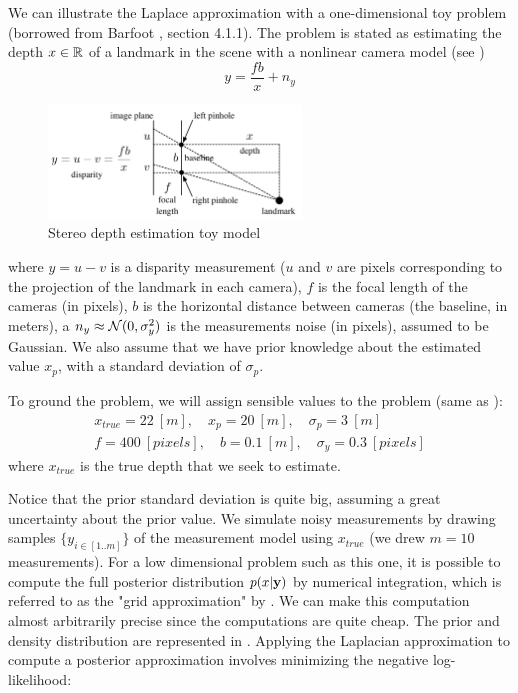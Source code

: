  We can illustrate the Laplace approximation with a one-dimensional toy problem (borrowed from Barfoot \cite{barfoot2017state}, section 4.1.1).
The problem is stated as estimating the depth $x \in \mathbb{R}$ of a landmark in the scene with a nonlinear camera model (see )
%
\begin{equation}
    y = \frac{fb}{x} + n_y
\end{equation}
%
%
\begin{figure}[h]
    \centering
    \includegraphics[width=0.6\textwidth]{figures/barfoot_stereo.png}
    \caption{Stereo depth estimation toy model \cite{barfoot2017state}}
    \label{fig:barfoot_stereo}
 \end{figure}
%
where $y=u - v$ is a disparity measurement ($u$ and $v$ are pixels corresponding to the projection of the landmark in each camera), $f$ is the focal
length of the cameras (in pixels), $b$ is the horizontal distance between cameras (the baseline, in meters), a $n_y \approx \mathcal{N}({0},{\sigma_y^2})$ 
is the measurements noise (in pixels), assumed to be Gaussian. We also assume that we have prior knowledge about the 
estimated value $x_p$, with a standard deviation of $\sigma_p$.

To ground the problem, we will assign sensible values to the problem (same as \cite{barfoot2017state}):
%
\begin{gather*}
    x_{true} = 22~[m], \quad x_p = 20~[m], \quad \sigma_p = 3~[m] \\
    f = 400~[pixels], \quad b = 0.1~[m], \quad \sigma_y = 0.3~[pixels]   
\end{gather*}
%
where $x_{true}$ is the true depth that we seek to estimate.

Notice that the prior standard deviation is quite big, assuming a great uncertainty about the prior value. We simulate noisy measurements by drawing samples 
$\{y_{i \in [1..m]}\}$ of the measurement model using $x_{true}$ (we drew $m=10$ measurements). For a low dimensional problem such as this one, 
it is possible to compute the full posterior distribution $p(x|{\bf y})$ by numerical integration, which is referred to as the "grid approximation" by 
\cite{mcelreath2018statistical}. We can make this computation almost arbitrarily precise since the computations are quite cheap. The prior and density distribution are represented in . Applying the Laplacian approximation to
compute a posterior approximation involves minimizing the negative log-likelihood:

